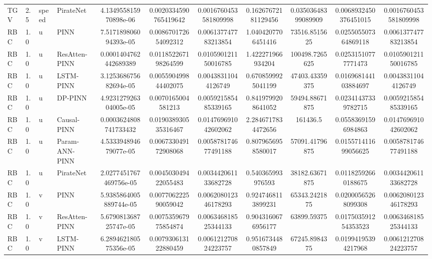 \begin{landscape}
\begin{longtable}{llllccccccc}
 TGV &    2.5 & speed &      PirateNet &  4.134955815970898e-06 &  0.0020334590765419642 &  0.0016760453581809998 &  0.16267672181129456 &   0.03503648399089909 & 0.0068932450376451015 &  0.0016760453581809998 \\
 RBC &    1.0 &     u &           PINN &  7.517189806094393e-05 &   0.008670172654092312 &   0.006137747783213854 &   1.0404207706451416 &         73516.8515625 &  0.025505507364869118 &   0.006137747783213854 \\
 RBC &    1.0 &     u &  ResAtten-PINN &  0.0001404762442689389 &   0.011852267198264599 &   0.010590121150016785 &    1.422271966934204 &        100498.7265625 &   0.02531510777771473 &   0.010590121150016785 \\
 RBC &    1.0 &     u &      LSTM-PINN &  3.125368675682694e-05 &   0.005590499844402075 &    0.00438311044126749 &   0.6708599925041199 &        47403.43359375 &  0.016968144103884697 &    0.00438311044126749 \\
 RBC &    1.0 &     u &        DP-PINN &  4.923127926304005e-05 &     0.0070165004581213 &   0.005921585485339165 &   0.8419799208641052 &        59494.88671875 &   0.02341437339782715 &   0.005921585485339165 \\
 RBC &    1.0 &     u &    Causal-PINN &  0.0003624808741733432 &   0.019038930535316467 &   0.014769691042602062 &   2.2846717834472656 &              161436.5 &   0.05583691596984863 &   0.014769691042602062 \\
 RBC &    1.0 &     u & Param-ANN-PINN &  4.533394894679077e-05 &   0.006733049172908068 &   0.005878174677491188 &   0.8079656958580017 &        57091.41796875 &  0.015571411699056625 &   0.005878174677491188 \\
 RBC &    1.0 &     u &      PirateNet & 2.0277451767469756e-05 &   0.004503049422055483 &   0.003442061133682728 &    0.540365993976593 &        38182.63671875 &   0.01182592660188675 &   0.003442061133682728 \\
 RBC &    1.0 &     v &           PINN & 5.9385864005889744e-05 &   0.007706222590059042 &   0.006208012346178293 &   0.9247468113899231 &         65343.2421875 &   0.02000565268099308 &   0.006208012346178293 \\
 RBC &    1.0 &     v &  ResAtten-PINN &  5.679081368725747e-05 &   0.007535967975854874 &   0.006346818525344133 &   0.9043160676956177 &           63899.59375 &  0.017503591254353523 &   0.006346818525344133 \\
 RBC &    1.0 &     v &      LSTM-PINN &  6.289462180575356e-05 &   0.007930613122880459 &   0.006121270824223757 &   0.9516734480857849 &         67245.8984375 &   0.01994195394217968 &   0.006121270824223757 \\

\end{longtable}
\end{landscape}
